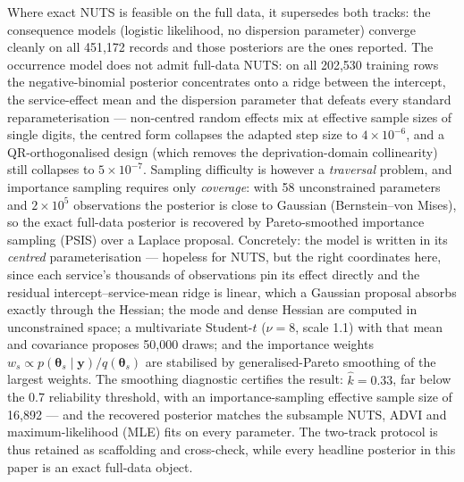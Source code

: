 Where exact NUTS is feasible on the full data, it supersedes both tracks: the
consequence models (logistic likelihood, no dispersion parameter) converge
cleanly on all 451{,}172 records and those posteriors are the ones reported.
The occurrence model does not admit full-data NUTS: on all 202{,}530 training
rows the negative-binomial posterior concentrates onto a ridge between the
intercept, the service-effect mean and the dispersion parameter that defeats
every standard reparameterisation --- non-centred random effects mix at
effective sample sizes of single digits, the centred form collapses the
adapted step size to $4\times10^{-6}$, and a QR-orthogonalised design (which
removes the deprivation-domain collinearity) still collapses to
$5\times10^{-7}$. Sampling difficulty is however a \emph{traversal} problem,
and importance sampling requires only \emph{coverage}: with 58 unconstrained
parameters and $2\times10^{5}$ observations the posterior is close to Gaussian
(Bernstein--von Mises), so the exact full-data posterior is recovered by
Pareto-smoothed importance sampling (PSIS) \citep{vehtari2024psis} over a
Laplace proposal. Concretely: the model is written in its \emph{centred}
parameterisation --- hopeless for NUTS, but the right coordinates here, since
each service's thousands of observations pin its effect directly and the
residual intercept--service-mean ridge is linear, which a Gaussian proposal
absorbs exactly through the Hessian; the mode and dense Hessian are computed
in unconstrained space; a multivariate Student-$t$ ($\nu=8$, scale 1.1) with
that mean and covariance proposes 50{,}000 draws; and the importance weights
$w_s \propto p(\boldsymbol\theta_s \mid \mathbf{y}) / q(\boldsymbol\theta_s)$
are stabilised by generalised-Pareto smoothing of the largest weights. The
smoothing diagnostic certifies the result: $\hat{k} = 0.33$, far below the 0.7
reliability threshold, with an importance-sampling effective sample size of
16{,}892 --- and the recovered posterior matches the subsample NUTS, ADVI and
maximum-likelihood (MLE) fits on every parameter. The two-track protocol is thus retained as
scaffolding and cross-check, while every headline posterior in this paper is
an exact full-data object.

